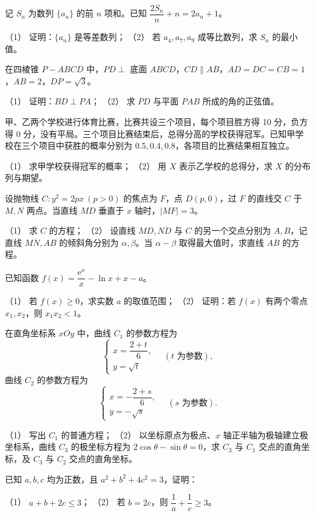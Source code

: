 \begin{question}
记 $S_n$ 为数列 $\{a_n\}$ 的前 $n$ 项和。已知 $\dfrac{2S_n}{n}+n=2a_n+1$。

（1） 证明：$\{a_n\}$ 是等差数列；  
（2） 若 $a_4,a_7,a_9$ 成等比数列，求 $S_n$ 的最小值。

\Needspace{0.4\textheight}
\end{question}
\begin{question}
在四棱锥 $P-ABCD$ 中，$PD\perp$ 底面 $ABCD$，$CD\parallel AB$，$AD=DC=CB=1$，$AB=2$，$DP=\sqrt3$。

（1） 证明：$BD\perp PA$；  
（2） 求 $PD$ 与平面 $PAB$ 所成的角的正弦值。
\nopagebreak[4]
\begin{center}\end{center}
\nopagebreak[4]
\end{question}
\begin{question}
甲、乙两个学校进行体育比赛，比赛共设三个项目，每个项目胜方得 10 分，负方得 0 分，没有平局。三个项目比赛结束后，总得分高的学校获得冠军。已知甲学校在三个项目中获胜的概率分别为 $0.5,0.4,0.8$，各项目的比赛结果相互独立。

（1） 求甲学校获得冠军的概率；  
（2） 用 $X$ 表示乙学校的总得分，求 $X$ 的分布列与期望。

\end{question}
\begin{question}
设抛物线 $C:y^2=2px\ (p>0)$ 的焦点为 $F$，点 $D(p,0)$，过 $F$ 的直线交 $C$ 于 $M,N$ 两点。当直线 $MD$ 垂直于 $x$ 轴时，$|MF|=3$。

（1） 求 $C$ 的方程；  
（2） 设直线 $MD,ND$ 与 $C$ 的另一个交点分别为 $A,B$，记直线 $MN,AB$ 的倾斜角分别为 $\alpha,\beta$。当 $\alpha-\beta$ 取得最大值时，求直线 $AB$ 的方程。

\end{question}
\begin{question}
已知函数 $f(x)=\dfrac{\mathrm e^x}{x}-\ln x+x-a$。

（1） 若 $f(x)\ge0$，求实数 $a$ 的取值范围；  
（2） 证明：若 $f(x)$ 有两个零点 $x_1,x_2$，则 $x_1x_2<1$。

\end{question}
\begin{question}
在直角坐标系 $xOy$ 中，曲线 $C_1$ 的参数方程为
\nopagebreak[4]
\[
\begin{cases}
x=\dfrac{2+t}{6},\\
y=\sqrt t
\end{cases}\quad(t\text{ 为参数}),
\]
曲线 $C_2$ 的参数方程为
\nopagebreak[4]
\[
\begin{cases}
x=-\dfrac{2+s}{6},\\
y=-\sqrt s
\end{cases}\quad(s\text{ 为参数}).
\]

（1） 写出 $C_1$ 的普通方程；  
（2） 以坐标原点为极点、$x$ 轴正半轴为极轴建立极坐标系，曲线 $C_3$ 的极坐标方程为 $2\cos\theta-\sin\theta=0$，求 $C_3$ 与 $C_1$ 交点的直角坐标，及 $C_3$ 与 $C_2$ 交点的直角坐标。

\end{question}
\begin{question}
已知 $a,b,c$ 均为正数，且 $a^2+b^2+4c^2=3$，证明：

（1） $a+b+2c\le3$；  
（2） 若 $b=2c$，则 $\dfrac1a+\dfrac1c\ge3$。

\end{question}